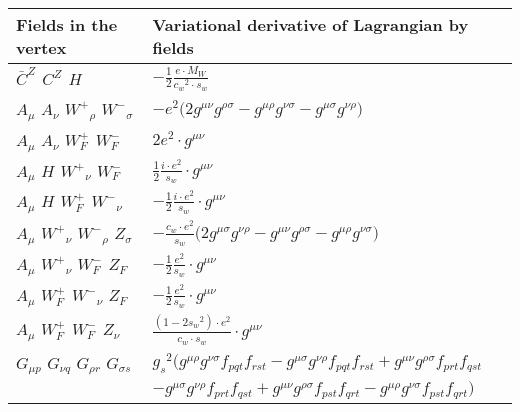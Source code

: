 \begin{center}
\begin{tabular}{|l|l|} \hline
Fields in the vertex & Variational derivative of Lagrangian by fields \\ \hline
$\bar{C}^{Z}{}_{}$ \phantom{-} $C^{Z}{}_{}$ \phantom{-} ${H}_{}$ \phantom{-}  &
	$-\frac{1}{2}\frac{ e \cdot M_W}{ c_w{}^2  \cdot s_w}$\\[2mm]
${A}_{\mu }$ \phantom{-} ${A}_{\nu }$ \phantom{-} $W^+{}_{\rho }$ \phantom{-} $W^-{}_{\sigma }$ \phantom{-}  &
	$- e{}^2 \big(2g^{\mu \nu} g^{\rho \sigma} -g^{\mu \rho} g^{\nu \sigma} -g^{\mu \sigma} g^{\nu \rho} \big)$\\[2mm]
${A}_{\mu }$ \phantom{-} ${A}_{\nu }$ \phantom{-} $W^+_F{}_{}$ \phantom{-} $W^-_F{}_{}$ \phantom{-}  &
	$2 e{}^2 \cdot g^{\mu \nu} $\\[2mm]
${A}_{\mu }$ \phantom{-} ${H}_{}$ \phantom{-} $W^+{}_{\nu }$ \phantom{-} $W^-_F{}_{}$ \phantom{-}  &
	$\frac{1}{2}\frac{ i \cdot e{}^2 }{ s_w}\cdot g^{\mu \nu} $\\[2mm]
${A}_{\mu }$ \phantom{-} ${H}_{}$ \phantom{-} $W^+_F{}_{}$ \phantom{-} $W^-{}_{\nu }$ \phantom{-}  &
	$-\frac{1}{2}\frac{ i \cdot e{}^2 }{ s_w}\cdot g^{\mu \nu} $\\[2mm]
${A}_{\mu }$ \phantom{-} $W^+{}_{\nu }$ \phantom{-} $W^-{}_{\rho }$ \phantom{-} ${Z}_{\sigma }$ \phantom{-}  &
	$-\frac{ c_w \cdot e{}^2 }{ s_w}\big(2g^{\mu \sigma} g^{\nu \rho} -g^{\mu \nu} g^{\rho \sigma} -g^{\mu \rho} g^{\nu \sigma} \big)$\\[2mm]
${A}_{\mu }$ \phantom{-} $W^+{}_{\nu }$ \phantom{-} $W^-_F{}_{}$ \phantom{-} $Z_F{}_{}$ \phantom{-}  &
	$-\frac{1}{2}\frac{ e{}^2 }{ s_w}\cdot g^{\mu \nu} $\\[2mm]
${A}_{\mu }$ \phantom{-} $W^+_F{}_{}$ \phantom{-} $W^-{}_{\nu }$ \phantom{-} $Z_F{}_{}$ \phantom{-}  &
	$-\frac{1}{2}\frac{ e{}^2 }{ s_w}\cdot g^{\mu \nu} $\\[2mm]
${A}_{\mu }$ \phantom{-} $W^+_F{}_{}$ \phantom{-} $W^-_F{}_{}$ \phantom{-} ${Z}_{\nu }$ \phantom{-}  &
	$\frac{ (1-2 s_w {}^2) \cdot e{}^2 }{ c_w \cdot s_w}\cdot g^{\mu \nu} $\\[2mm]
${G}_{\mu p }$ \phantom{-} ${G}_{\nu q }$ \phantom{-} ${G}_{\rho r }$ \phantom{-} ${G}_{\sigma s }$ \phantom{-}  &
	$ g_s{}^2 \big(g^{\mu \rho} g^{\nu \sigma} f_{p q t} f_{r s t} -g^{\mu \sigma} g^{\nu \rho} f_{p q t} f_{r s t} +g^{\mu \nu} g^{\rho \sigma} f_{p r t} f_{q s t} $ \\[2mm]
  & $-g^{\mu \sigma} g^{\nu \rho} f_{p r t} f_{q s t} +g^{\mu \nu} g^{\rho \sigma} f_{p s t} f_{q r t} -g^{\mu \rho} g^{\nu \sigma} f_{p s t} f_{q r t} \big)$\\[2mm]

\end{tabular}
\end{center}
